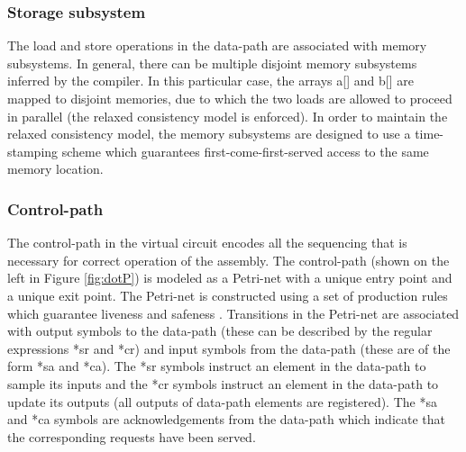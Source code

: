 \documentclass[conference]{IEEEtran}
\begin{document}
\subsubsection{Storage subsystem}

The load and store operations in the data-path
are associated with memory subsystems.  In general, there
can be multiple disjoint memory subsystems inferred by the
compiler.  In this particular case, the arrays a[] and b[] 
are mapped to disjoint memories, due to which the two
loads are allowed to proceed in parallel (the relaxed consistency
model is enforced).
In order to maintain the relaxed consistency model, the
memory subsystems are designed to use a time-stamping 
scheme which guarantees first-come-first-served access to
the same memory location.

\subsubsection{Control-path}


The control-path in the virtual circuit encodes
all the sequencing that is necessary for correct
operation of the assembly.
The control-path (shown on the left
in Figure \ref{fig:dotP}) is modeled as a Petri-net with
a unique entry point and a unique exit point.  The Petri-net
is constructed using a set of production rules which guarantee
liveness and safeness \cite{c:ahir_dsd2010}.  Transitions in the Petri-net
are associated with output symbols to the data-path (these can
be described by the regular expressions *sr and *cr)
and input symbols from the data-path (these are of the form *sa and
*ca).  The *sr symbols instruct an element in the data-path to
sample its inputs and the *cr symbols instruct an element in the
data-path to update its outputs (all outputs of data-path elements
are registered).  The *sa and *ca symbols are acknowledgements
from the data-path which indicate that the corresponding requests
have been served.  
\end{document}
